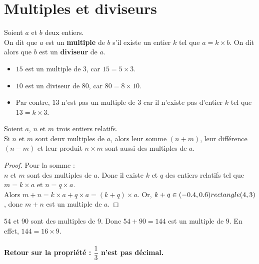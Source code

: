\section{Multiples et diviseurs}
\begin{Définition}
Soient $a$ et $b$ deux entiers. \\On dit que $a$ est un {\bf{multiple}} de $b$ s'il existe un entier $k$
tel que $a = k\times b$. On dit alors que $b$ est un {\bf{diviseur}} de $a$.
\end{Définition}
\begin{Exemple}
\leavevmode\vspace{-\baselineskip}
\begin{itemize}[label=\textcolor{Couleur8}{$\bullet$}]
\item $15$ est un multiple de $3$, car $15 = 5 \times 3$.
\item $10$ est un diviseur de $80$, car $80 = 8 \times 10$. 
\item Par contre, $13$ n'est pas un multiple de $3$ car il n'existe pas d'entier $k$ tel que $13 = k \times 3$.
\end{itemize}
\end{Exemple}
\begin{Propriété}
Soient $a$, $n$ et $m$ trois entiers relatifs.
\\Si $n$ et $m$ sont deux multiples de $a$, alors leur somme $(n+m)$, leur différence $(n-m)$ et leur
produit $n\times m$ sont aussi des multiples de $a$.
\end{Propriété}

\begin{proof}
Pour la somme : \\$n$ et $m$ sont des multiples de $a$. Donc il existe $k$ et $q$ des entiers relatifs tel que $m=k\times a$ et $n=q\times a$. \\Alors $m+n=k\times a+q\times a=(k+q)\times a$. Or, $k+q\in (-0.4,0.6) rectangle (4,3)$, donc $m+n$ est un multiple de $a$.
\end{proof}

\begin{Exemple}
$54$ et $90$ sont des multiples de $9$. Donc $54+90=144$ est un multiple de $9$. En effet, $144=16\times 9$. 
\end{Exemple}



\paragraph{Retour sur la propriété : $\dfrac{1}{3}$ n'est pas décimal.}

